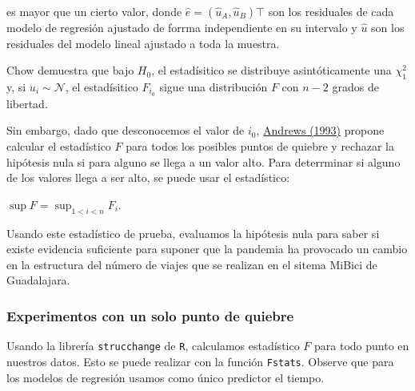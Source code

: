 \documentclass[
]{article}
\newenvironment{Shaded}{}{}
\newcommand{\AttributeTok}[1]{\textcolor[rgb]{0.49,0.56,0.16}{#1}}
\newcommand{\CommentTok}[1]{\textcolor[rgb]{0.38,0.63,0.69}{\textit{#1}}}
\newcommand{\DecValTok}[1]{\textcolor[rgb]{0.25,0.63,0.44}{#1}}
\newcommand{\FunctionTok}[1]{\textcolor[rgb]{0.02,0.16,0.49}{#1}}
\newcommand{\NormalTok}[1]{#1}
\newcommand{\OtherTok}[1]{\textcolor[rgb]{0.00,0.44,0.13}{#1}}
\newcommand{\SpecialCharTok}[1]{\textcolor[rgb]{0.25,0.44,0.63}{#1}}
\newcommand{\StringTok}[1]{\textcolor[rgb]{0.25,0.44,0.63}{#1}}
\begin{document}
es mayor que un cierto valor, donde
\(\hat e = (\hat u_A, \hat u_B)\top\) son los residuales de cada modelo
de regresión ajustado de forrma independiente en su intervalo y
\(\hat u\) son los residuales del modelo lineal ajustado a toda la
muestra.

Chow demuestra que bajo \(H_0\), el estadísitico se distribuye
asintóticamente una \(\chi^2_1\) y, si \(u_i \sim \mathcal N\), el
estadísitico \(F_{i_0}\) sigue una distribución \(F\) con \(n-2\) grados
de libertad.

Sin embargo, dado que desconocemos el valor de \(i_0\),
\href{https://www.jstor.org/stable/2951764}{Andrews (1993)} propone
calcular el estadístico \(F\) para todos los posibles puntos de quiebre
y rechazar la hipótesis nula si para alguno se llega a un valor alto.
Para deterrminar si alguno de los valores llega a ser alto, se puede
usar el estadístico:

\(\sup F = \sup_{1< i <n} F_i.\)

Usando este estadístico de prueba, evaluamos la hipótesis nula para
saber si existe evidencia suficiente para suponer que la pandemia ha
provocado un cambio en la estructura del número de viajes que se
realizan en el sitema MiBici de Guadalajara.

\newpage
\hypertarget{experimentos-con-un-solo-punto-de-quiebre}{%
\subsubsection{Experimentos con un solo punto de
quiebre}\label{experimentos-con-un-solo-punto-de-quiebre}}

Usando la librería \texttt{strucchange} de \texttt{R}, calculamos
estadístico \(F\) para todo punto en nuestros datos. Esto se puede
realizar con la función \texttt{Fstats}. Observe que para los modelos de
regresión usamos como único predictor el tiempo.

\begin{Shaded}
\end{Shaded}
\end{document}
